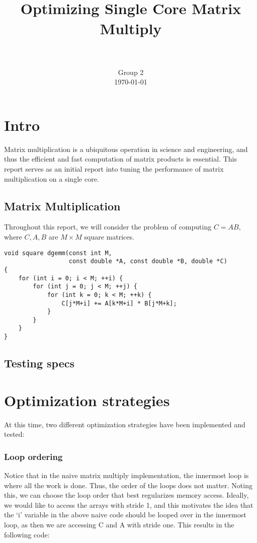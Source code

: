 \documentclass[paper=a4, fontsize=11pt]{scrartcl}
\title{
        \usefont{OT1}{bch}{b}{n}
        \horrule{0.5pt} \\[0.4cm]
        \huge Optimizing Single Core Matrix Multiply \\
        \horrule{2pt} \\[0.5cm]
}
\author{
        \normalfont                                 \normalsize
        Group 2\\[-3pt]      \normalsize
        \today
}
\date{}
\numberwithin{equation}{section}        %
\numberwithin{figure}{section}          %
\numberwithin{table}{section}               %
\begin{document}
\maketitle

\section{Intro}
Matrix multiplication is a ubiquitous operation in science and engineering,
and thus the efficient and fast computation of matrix products is essential.
This report serves as an initial report into tuning the performance of matrix
multiplication on a single core.

\subsection{Matrix Multiplication}
Throughout this report, we will consider the problem of computing
$C = A B$, where $C, A, B$ are $M \times M$ square matrices.

\begin{lstlisting}[frame = single, caption={Naive Square Matrix Multiply}]
void square dgemm(const int M, 
                  const double *A, const double *B, double *C)
{
    for (int i = 0; i < M; ++i) {
        for (int j = 0; j < M; ++j) {
            for (int k = 0; k < M; ++k) {
                C[j*M+i] += A[k*M+i] * B[j*M+k];
            }
        }
    }
}
\end{lstlisting}

\subsection{Testing specs}

\section{Optimization strategies}

At this time, two different optimization strategies have been implemented and
tested: 

\subsubsection{Loop ordering}
Notice that in the naive matrix multiply implementation, the innermost loop
is where all the work is done.  Thus, the order of the loops does not matter.
Noting this, we can choose the loop order that best regularizes memory access.
Ideally, we would like to access the arrays with stride 1, and this motivates the
idea that the `i' variable in the above naive code should be looped over in the 
innermost loop, as then we are accessing C and A with stride one.  This results in 
the following code:
\end{document}

